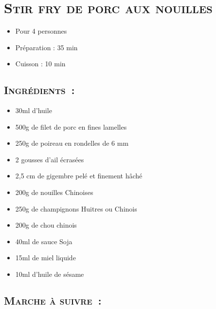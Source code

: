 \section[\normalsize{Stir fry de porc aux nouilles}]{\LARGE{\textsc{Stir fry de porc aux nouilles}}}		%


\begin{itemize}
\item Pour 4 personnes
\item Préparation : 35 min
\item Cuisson : 10 min
\end{itemize}

\subsection*{\textsc{Ingr\'edients~:}}

\begin{itemize}
\item 30ml d'huile
\item 500g de filet de porc en fines lamelles 
\item 250g de poireau en rondelles de 6 mm 
\item 2 gousses d'ail \'ecras\'ees 
\item 2,5 cm de gigembre pel\'e et finement h\^ach\'e 
\item 200g de nouilles Chinoises 
\item 250g de champignons Huitres ou Chinois 
\item 200g de chou chinois 
\item 40ml de sauce Soja
\item 15ml de miel liquide 
\item 10ml d'huile de s\'esame 
\end{itemize}


\subsection*{\textsc{Marche \`a suivre~:}}

